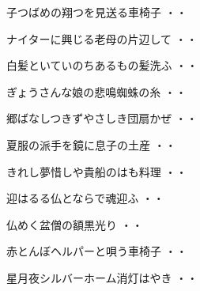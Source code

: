 \begin{shiika}子つばめの翔つを見送る車椅子
\hfill{・・}\end{shiika}
\vspace{0.4cm}
\begin{shiika}ナイターに興じる老母の片辺して
\hfill{・・}\end{shiika}
\vspace{0.4cm}
\begin{shiika}白髪といていのちあるもの髪洗ふ
\hfill{・・}\end{shiika}
\vspace{0.4cm}
\begin{shiika}ぎょうさんな娘の悲鳴蜘蛛の糸
\hfill{・・}\end{shiika}
\vspace{0.4cm}
\begin{shiika}郷ばなしつきずやさしき団扇かぜ
\hfill{・・}\end{shiika}
\vspace{0.4cm}
\begin{shiika}夏服の派手を鏡に息子の土産
\hfill{・・}\end{shiika}
\vspace{0.4cm}
\begin{shiika}きれし夢惜しや貴船のはも料理
\hfill{・・}\end{shiika}
\vspace{0.4cm}
\begin{shiika}迎はるる仏とならで魂迎ふ
\hfill{・・}\end{shiika}
\vspace{0.4cm}
\begin{shiika}仏めく盆僧の額黒光り
\hfill{・・}\end{shiika}
\vspace{0.4cm}
\begin{shiika}赤とんぼヘルパーと唄う車椅子
\hfill{・・}\end{shiika}
\vspace{0.4cm}
\begin{shiika}星月夜シルバーホーム消灯はやき
\hfill{・・}\end{shiika}
\vspace{0.4cm}

